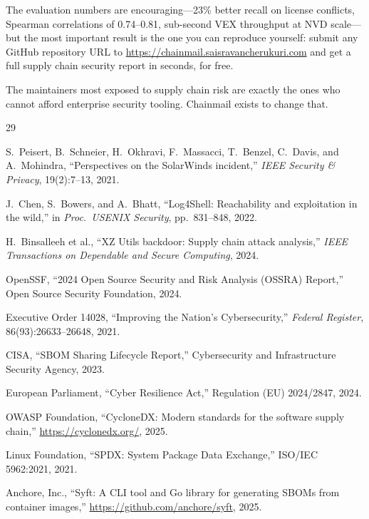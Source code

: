\documentclass[11pt,twocolumn]{article}
\begin{document}
The evaluation numbers are encouraging---23\% better recall on license conflicts,
Spearman correlations of 0.74--0.81, sub-second VEX throughput at NVD scale---but
the most important result is the one you can reproduce yourself: submit any GitHub
repository URL to \url{https://chainmail.saisravancherukuri.com} and get a full supply chain security
report in seconds, for free.

The maintainers most exposed to supply chain risk are exactly the ones who cannot
afford enterprise security tooling. Chainmail exists to change that.

\begin{thebibliography}{29}

S.\ Peisert, B.\ Schneier, H.\ Okhravi, F.\ Massacci, T.\ Benzel, C.\ Davis,
and A.\ Mohindra,
``Perspectives on the SolarWinds incident,''
\emph{IEEE Security \& Privacy}, 19(2):7--13, 2021.

J.\ Chen, S.\ Bowers, and A.\ Bhatt,
``Log4Shell: Reachability and exploitation in the wild,''
in \emph{Proc.\ USENIX Security}, pp.\ 831--848, 2022.

H.\ Binsalleeh et al.,
``XZ Utils backdoor: Supply chain attack analysis,''
\emph{IEEE Transactions on Dependable and Secure Computing}, 2024.

OpenSSF,
``2024 Open Source Security and Risk Analysis (OSSRA) Report,''
Open Source Security Foundation, 2024.

Executive Order 14028,
``Improving the Nation's Cybersecurity,''
\emph{Federal Register}, 86(93):26633--26648, 2021.

CISA,
``SBOM Sharing Lifecycle Report,''
Cybersecurity and Infrastructure Security Agency, 2023.

European Parliament,
``Cyber Resilience Act,'' Regulation (EU) 2024/2847, 2024.

OWASP Foundation,
``CycloneDX: Modern standards for the software supply chain,''
\url{https://cyclonedx.org/}, 2025.

Linux Foundation,
``SPDX: System Package Data Exchange,''
ISO/IEC 5962:2021, 2021.

Anchore, Inc.,
``Syft: A CLI tool and Go library for generating SBOMs from container images,''
\url{https://github.com/anchore/syft}, 2025.


\end{thebibliography}
\end{document}
